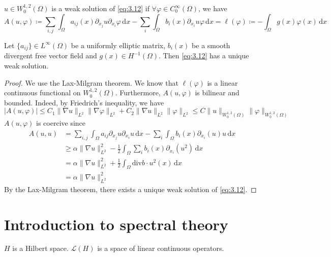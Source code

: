 \documentclass{report}
\begin{document}
\begin{definition}{}{}
    \(u \in W^{1, 2}_{0}(\Omega)\) is a weak solution of \ref{eq:3.12} if \(\forall \varphi \in C^{\infty}_{0}(\Omega)\), we have 
    \[
        A(u, \varphi) \coloneqq \sum_{i, j} \int_{\Omega} a_{ij}(x) \partial_{x_{j}}u \partial_{x_{i}}\varphi \,\mathrm{d}x - \sum_{i} \int_{\Omega} b_{i}(x) \partial_{x_{i}} u \varphi \,\mathrm{d}x = \ell(\varphi) \coloneqq - \int_{\Omega} g(x)\varphi(x) \,\mathrm{d}x
    \]
\end{definition}

\begin{theorem}{}{}
    Let \(\{a_{ij}\} \in L^{\infty}(\Omega)\) be a uniformly elliptic matrix, \(b_{i}(x)\) be a smooth divergent free vector field and \(g(x) \in H^{-1}(\Omega)\). Then \ref{eq:3.12} has a unique weak solution.
\end{theorem}

\begin{proof}
    We use the Lax-Milgram theorem. We know that \(\ell(\varphi)\) is a linear continuous functional on \(W^{1, 2}_{0}(\Omega)\). Furthermore, \(A(u, \varphi)\) is bilinear and bounded. Indeed, by Friedrich's inequality, we have
    \[
        \vert A(u, \varphi) \vert \leq C_{1}\|\nabla u\|_{L^{2}} \|\nabla \varphi\|_{L^{2}} + C_2\|\nabla u\|_{L^{2}}\|\varphi\|_{L^{2}} \leq C\|u\|_{W^{1, 2}_{0}(\Omega)}\|\varphi\|_{W^{1, 2}_{0}(\Omega)}
    \]
    \(A(u, \varphi)\) is coercive since 
    \begin{align*}
        A(u, u) &= \sum_{i, j} \int_{\Omega} a_{ij} \partial_{x_{j}}u \partial_{x_{i}}u \,\mathrm{d}x - \sum_{i} \int_{\Omega} b_{i}(x) \partial_{x_{i}} (u) u \,\mathrm{d}x \\
        &\geq \alpha \|\nabla u\|_{L^{2}}^{2} - \frac{1}{2}\int_{\Omega} \sum_{i} b_{i}(x) \partial_{x_{i}} (u^{2}) \,\mathrm{d}x \\
        &= \alpha \|\nabla u\|_{L^{2}}^{2} + \frac{1}{2} \int_{\Omega} \text{div}b \cdot u^{2}(x) \,\mathrm{d}x \\
        &= \alpha\|\nabla u\|_{L^{2}}^{2}
    \end{align*}
    By the Lax-Milgram theorem, there exists a unique weak solution of \ref{eq:3.12}.
\end{proof}

\section{Introduction to spectral theory}
\(H\) is a Hilbert space. \(\mathcal{L}(H)\) is a space of linear continuous operators.
\end{document}
